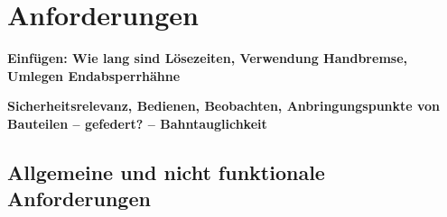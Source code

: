 \section{Anforderungen}
\textbf{Einfügen: Wie lang sind Lösezeiten, Verwendung Handbremse, Umlegen Endabsperrhähne}\par
\textbf{Sicherheitsrelevanz, Bedienen, Beobachten, Anbringungspunkte von Bauteilen -- gefedert? -- Bahntauglichkeit}\par
\subsection{Allgemeine und nicht funktionale Anforderungen}














